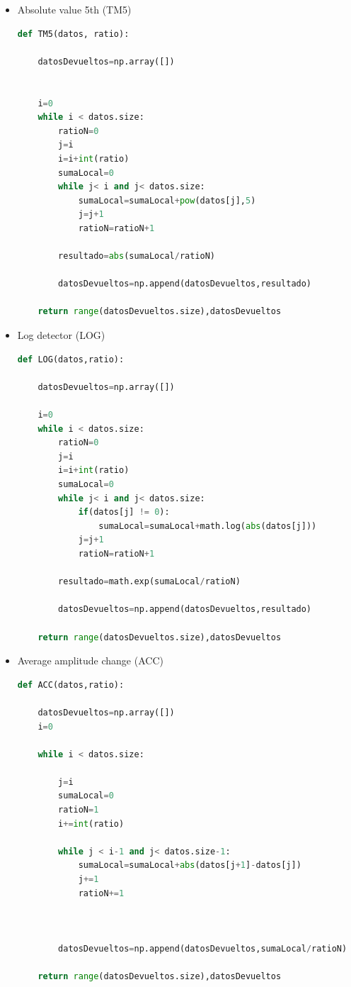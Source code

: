 \begin{itemize}
\item Absolute value 5th (TM5)
\begin{lstlisting}[language=Python]
def TM5(datos, ratio):
    
    datosDevueltos=np.array([])
    
    
    i=0
    while i < datos.size:
        ratioN=0
        j=i
        i=i+int(ratio)
        sumaLocal=0
        while j< i and j< datos.size:
            sumaLocal=sumaLocal+pow(datos[j],5)
            j=j+1
            ratioN=ratioN+1
            
        resultado=abs(sumaLocal/ratioN)
        
        datosDevueltos=np.append(datosDevueltos,resultado)
        
    return range(datosDevueltos.size),datosDevueltos
\end{lstlisting}


\newpage
\item Log detector (LOG)
\begin{lstlisting}[language=Python]
def LOG(datos,ratio):
    
    datosDevueltos=np.array([])
    
    i=0
    while i < datos.size:
        ratioN=0
        j=i
        i=i+int(ratio)
        sumaLocal=0
        while j< i and j< datos.size:
            if(datos[j] != 0):
                sumaLocal=sumaLocal+math.log(abs(datos[j]))
            j=j+1
            ratioN=ratioN+1
            
        resultado=math.exp(sumaLocal/ratioN)
        
        datosDevueltos=np.append(datosDevueltos,resultado)
        
    return range(datosDevueltos.size),datosDevueltos
\end{lstlisting}

\item Average amplitude change (ACC)
\begin{lstlisting}[language=Python]
def ACC(datos,ratio):
    
    datosDevueltos=np.array([])
    i=0
    
    while i < datos.size:
        
        j=i
        sumaLocal=0
        ratioN=1
        i+=int(ratio)
        
        while j < i-1 and j< datos.size-1:
            sumaLocal=sumaLocal+abs(datos[j+1]-datos[j])
            j+=1
            ratioN+=1
            
            
            
        datosDevueltos=np.append(datosDevueltos,sumaLocal/ratioN)
    
    return range(datosDevueltos.size),datosDevueltos
\end{lstlisting}
\end{itemize}

